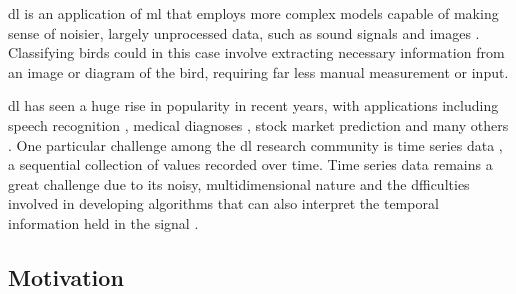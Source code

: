 \ac{dl} is an application of \ac{ml} that employs more complex models capable of making sense of noisier, largely unprocessed data, such as sound signals and images \cite[]{goodfellow_deep_2016}. Classifying birds could in this case involve extracting necessary information from an image or diagram of the bird, requiring far less manual measurement or input.

\ac{dl} has seen a huge rise in popularity in recent years, with applications including speech recognition \cite[]{deng_machine_2013}, medical diagnoses \cite[]{lee_diagnosis_2018}, stock market prediction \cite[]{krollner_financial_2010} and many others \cite[]{kelleher_fundamentals_2015}. One particular challenge among the \ac{dl} research community is time series data \cite[]{yang_10_2006}, a sequential collection of values recorded over time. Time series data remains a great challenge due to its noisy, multidimensional nature \cite[]{kelleher_fundamentals_2015} and the dfficulties involved in developing algorithms that can also interpret the temporal information held in the signal \cite[]{bagnall_great_2017}.

\subsection{Motivation}
